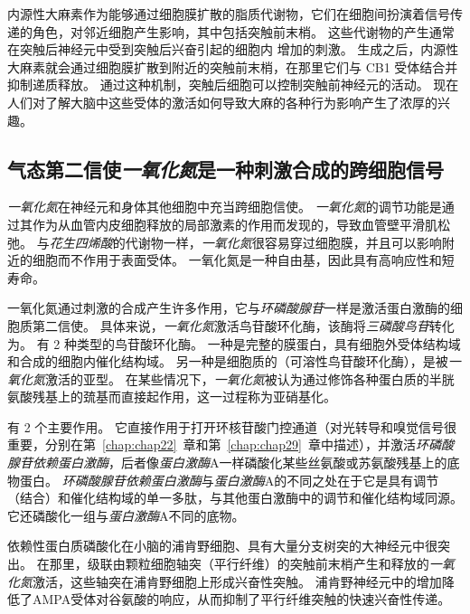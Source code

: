 内源性大麻素作为能够通过细胞膜扩散的脂质代谢物，它们在细胞间扮演着信号传递的角色，对邻近细胞产生影响，其中包括突触前末梢。
这些代谢物的产生通常在突触后神经元中受到突触后兴奋引起的细胞内  增加的刺激。
生成之后，内源性大麻素就会通过细胞膜扩散到附近的突触前末梢，在那里它们与 CB1 受体结合并抑制递质释放。
通过这种机制，突触后细胞可以控制突触前神经元的活动。 
现在人们对了解大脑中这些受体的激活如何导致大麻的各种行为影响产生了浓厚的兴趣。



\subsection{气态第二信使\textit{一氧化氮}是一种刺激合成的跨细胞信号}

\textit{一氧化氮}在神经元和身体其他细胞中充当跨细胞信使。
\textit{一氧化氮}的调节功能是通过其作为从血管内皮细胞释放的局部激素的作用而发现的，导致血管壁平滑肌松弛。
与\textit{花生四烯酸}的代谢物一样，\textit{一氧化氮}很容易穿过细胞膜，并且可以影响附近的细胞而不作用于表面受体。
一氧化氮是一种自由基，因此具有高响应性和短寿命。


一氧化氮通过刺激的合成产生许多作用，它与\textit{环磷酸腺苷}一样是激活蛋白激酶的细胞质第二信使。
具体来说，\textit{一氧化氮}激活鸟苷酸环化酶，该酶将\textit{三磷酸鸟苷}转化为。
有 2 种类型的鸟苷酸环化酶。
一种是完整的膜蛋白，具有细胞外受体结构域和合成的细胞内催化结构域。
另一种是细胞质的（可溶性鸟苷酸环化酶），是被\textit{一氧化氮}激活的亚型。
在某些情况下，\textit{一氧化氮}被认为通过修饰各种蛋白质的半胱氨酸残基上的巯基而直接起作用，这一过程称为亚硝基化。


有 2 个主要作用。
它直接作用于打开环核苷酸门控通道（对光转导和嗅觉信号很重要，分别在第~\ref{chap:chap22}~章和第~\ref{chap:chap29}~章中描述），并激活\textit{环磷酸腺苷依赖蛋白激酶}，后者像\textit{蛋白激酶}A一样磷酸化某些丝氨酸或苏氨酸残基上的底物蛋白。
\textit{环磷酸腺苷依赖蛋白激酶}与\textit{蛋白激酶}A的不同之处在于它是具有调节（结合）和催化结构域的单一多肽，与其他蛋白激酶中的调节和催化结构域同源。
它还磷酸化一组与\textit{蛋白激酶}A不同的底物。


依赖性蛋白质磷酸化在小脑的浦肯野细胞、具有大量分支树突的大神经元中很突出。
在那里，级联由颗粒细胞轴突（平行纤维）的突触前末梢产生和释放的\textit{一氧化氮}激活，这些轴突在浦肯野细胞上形成兴奋性突触。
浦肯野神经元中的增加降低了AMPA受体对谷氨酸的响应，从而抑制了平行纤维突触的快速兴奋性传递。



